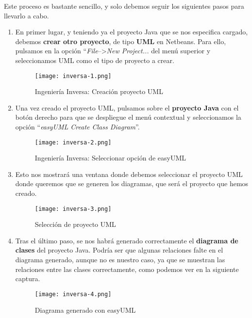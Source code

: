 Este proceso es bastante sencillo, y solo debemos seguir los siguientes pasos para llevarlo a cabo.

\begin{enumerate}
    \item En primer lugar, y teniendo ya el proyecto Java que se nos especifica cargado, debemos \textbf{crear otro proyecto}, de tipo \textbf{UML} en Netbeans. Para ello, pulsamos en la opción ``\textit{File}-->\textit{New Project...} del menú superior y seleccionamos UML como el tipo de proyecto a crear.

    \begin{figure}[H]
        \centering
        \texttt{[image: inversa-1.png]}
        \caption{Ingeniería Inversa: Creación proyecto UML}
    \end{figure}

    \item Una vez creado el proyecto UML, pulsamos sobre el \textbf{proyecto Java} con el botón derecho para que se despliegue el menú contextual y seleccionamos la opción ``\textit{easyUML Create Class Diagram}''.

    \begin{figure}[H]
        \centering
        \texttt{[image: inversa-2.png]}
        \caption{Ingeniería Inversa: Seleccionar opción de easyUML}
    \end{figure}

    \item Esto nos mostrará una ventana donde debemos seleccionar el proyecto UML donde queremos que se generen los diagramas, que será el proyecto que hemos creado.

    \begin{figure}[H]
        \centering
        \texttt{[image: inversa-3.png]}
        \caption{Selección de proyecto UML}
    \end{figure}


    \item Tras el último paso, se nos habrá generado correctamente el \textbf{diagrama de clases} del proyecto Java. Podría ser que algunas relaciones falte en el diagrama generado, aunque no es nuestro caso, ya que se muestran las relaciones entre las clases correctamente, como podemos ver en la siguiente captura.

    \begin{figure}[H]
        \centering
        \texttt{[image: inversa-4.png]}
        \caption{Diagrama generado con easyUML}
    \end{figure}
\end{enumerate}

